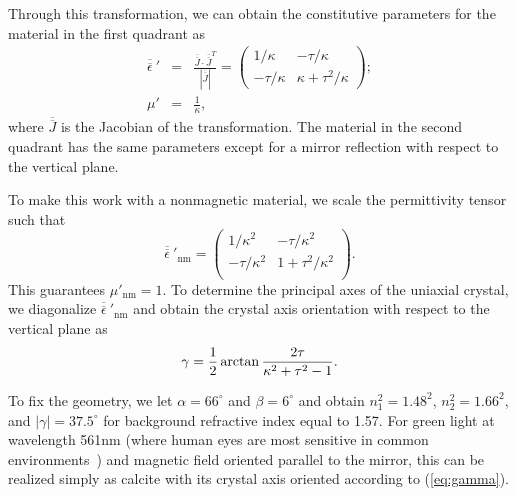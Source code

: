 \documentclass[preprint,preprintnumbers,amsmath,amssymb]{revtex4}
\begin{document}
Through this transformation, we can obtain the constitutive
parameters for the material in the first quadrant as
\begin{eqnarray}
\overline{\overline{\epsilon}}\:{}' & =  & \frac{\overline{\overline J} \cdot \overline{\overline{J}}^{T}}{|\overline{\overline J}|} = \left( \begin{array}{cc} 1/\kappa & -\tau /\kappa   \\
-\tau /\kappa & \kappa +\tau^2/\kappa
\end{array} \right); \\
\mu' & = & \frac{1}{\kappa},
\end{eqnarray}
where $\overline{\overline J}$ is the Jacobian of the
transformation. The material in the second quadrant has the same
parameters except for a mirror reflection with respect to the vertical plane.

To make this work with a nonmagnetic material, we scale the permittivity tensor such that
\begin{equation}
\overline{\overline{\epsilon}}\:{}'{}_{\text{nm}} = \left( \begin{array}{cc} 1/\kappa^2 & -\tau /\kappa^2\\
-\tau /\kappa^2 & 1 +\tau^2/\kappa^2\\
\end{array} \right).
\end{equation}
This guarantees $\mu'{}_{\text{nm}}=1$. To determine the principal axes of the uniaxial crystal, we diagonalize $\overline{\overline{\epsilon}}\:{}'{}_{\text{nm}}$ and obtain the crystal axis orientation with respect to the vertical plane as
\begin{equation}
\gamma = {1\over 2} \arctan \frac{2 \tau}{\kappa^2 + \tau^2 -1} \label{eq:gamma}.
\end{equation}

To fix the geometry, we let $\alpha = 66^{\circ}$ and $\beta = 6^{\circ}$ and obtain $n_1^2=1.48^2$, $n_2^2=1.66^2$, and $\left|\gamma\right|=37.5^\circ$ for background refractive index equal to 1.57. For green light at wavelength 561nm (where human eyes are most sensitive in common environments~\cite{wyszecki}) and magnetic field oriented parallel to the mirror, this can be realized simply as calcite with its crystal axis oriented according to (\ref{eq:gamma}).
\end{document}
